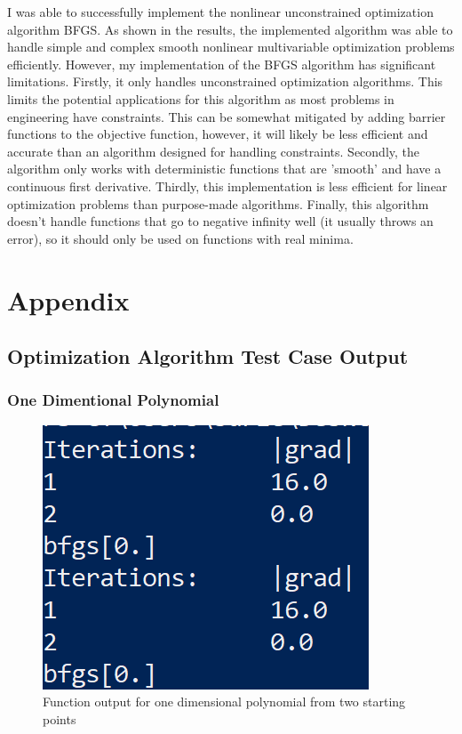 \documentclass[11pt]{article}%
\begin{document}
I was able to successfully implement the nonlinear unconstrained optimization algorithm BFGS. As shown in the results, the implemented algorithm was able to handle simple and complex smooth nonlinear multivariable optimization problems efficiently. However, my implementation of the BFGS algorithm has significant limitations. Firstly, it only handles unconstrained optimization algorithms. This limits the potential applications for this algorithm as most problems in engineering have constraints. This can be somewhat mitigated by adding barrier functions to the objective function, however, it will likely be less efficient and accurate than an algorithm designed for handling constraints. Secondly, the algorithm only works with deterministic functions that are 'smooth' and have a continuous first derivative. Thirdly, this implementation is less efficient for linear optimization problems than purpose-made algorithms. Finally, this algorithm doesn't handle functions that go to negative infinity well (it usually throws an error), so it should only be used on functions with real minima.

\printbibliography
\newpage
\section{Appendix}

\subsection{Optimization Algorithm Test Case Output}

\subsubsection{One Dimentional Polynomial}
\label{sec:onedpoly}
\begin{figure}[!ht]
    \centering
   \includegraphics[width=0.75\linewidth]{oned.png}
    \caption{Function output for one dimensional polynomial from two starting points}
    \label{fig:onedpoly}
\end{figure}
\newpage
\end{document}
